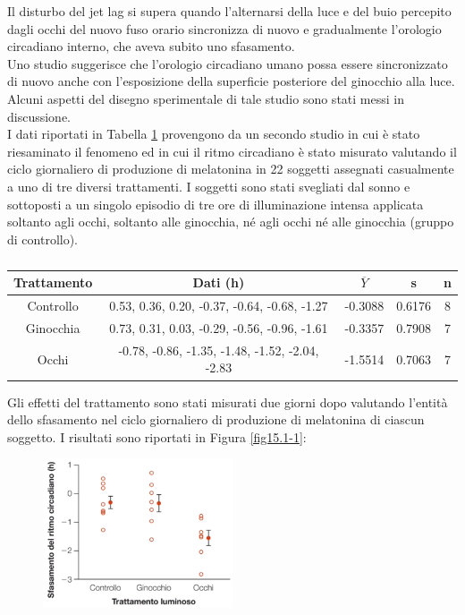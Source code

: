 \documentclass[10pt, draft]{book}
\newcounter{example}[section]
\begin{document}
\begin{example}\label{esluce}
    Il disturbo del jet lag si supera quando l'alternarsi della luce e del buio percepito dagli occhi del nuovo fuso orario sincronizza di nuovo e gradualmente l'orologio circadiano interno, che aveva subito uno sfasamento.\\
    Uno studio suggerisce che l'orologio circadiano umano possa essere sincronizzato di nuovo anche con l'esposizione della superficie posteriore del ginocchio alla luce. Alcuni aspetti del disegno sperimentale di tale studio sono stati messi in discussione.\\
    I dati riportati in Tabella \ref{tabluce} provengono da un secondo studio in cui è stato riesaminato il fenomeno ed in cui il ritmo circadiano è stato misurato valutando il ciclo giornaliero di produzione di melatonina in 22 soggetti assegnati casualmente a uno di tre diversi trattamenti. I soggetti sono stati svegliati dal sonno e sottoposti a un singolo episodio di tre ore di illuminazione intensa applicata soltanto agli occhi, soltanto alle ginocchia, né agli occhi né alle ginocchia (gruppo di controllo).\\
    \begin{table}[H]
        \centering
        \renewcommand\arraystretch{1.2}
        \begin{tabular}{c||c|c|c|c}
        \textbf{Trattamento} & \textbf{Dati (h)} & \textbf{$\overline{Y}$} & \textbf{s} & \textbf{n}\\ 
        \hline
        \hline
        Controllo & 0.53, 0.36, 0.20, -0.37, -0.64, -0.68, -1.27 & -0.3088 & 0.6176 & 8\\
        \hline
        Ginocchia & 0.73, 0.31, 0.03, -0.29, -0.56, -0.96, -1.61 & -0.3357 & 0.7908 & 7\\
        \hline
        Occhi & -0.78, -0.86, -1.35, -1.48, -1.52, -2.04, -2.83 & -1.5514 & 0.7063 & 7\\
        \hline
        \end{tabular}
        \caption{\small{}}
        \label{tabluce}
    \end{table}\noindent
    Gli effetti del trattamento sono stati misurati due giorni dopo valutando l'entità dello sfasamento nel ciclo giornaliero di produzione di melatonina di ciascun soggetto. I risultati sono riportati in Figura \ref{fig15.1-1}:
    \begin{figure}[H]
        \centering
        \includegraphics[width=0.5\textwidth]{fig15.1-1}

\end{figure}
\end{example}
\end{document}
